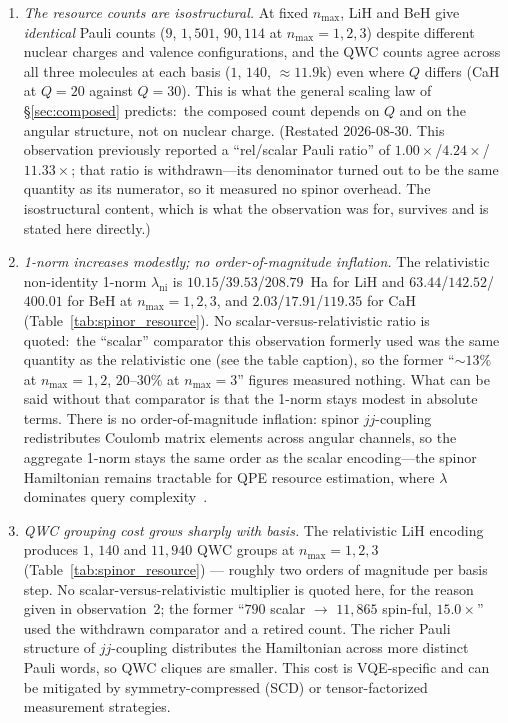 \documentclass[aps,pra,twocolumn,superscriptaddress,longbibliography]{revtex4-2}
\begin{document}
\begin{enumerate}
  \item \emph{The resource counts are isostructural.} At fixed
    $n_{\max}$, LiH and BeH give \emph{identical} Pauli counts
    ($9$, $1{,}501$, $90{,}114$ at $n_{\max}=1,2,3$) despite different
    nuclear charges and valence configurations, and the QWC counts agree
    across all three molecules at each basis ($1$, $140$, $\approx\!11.9$k)
    even where $Q$ differs (CaH at $Q=20$ against $Q=30$).  This is what the
    general scaling law of \S\ref{sec:composed} predicts:\ the composed
    count depends on $Q$ and on the angular structure, not on nuclear
    charge.  (Restated 2026-08-30.  This observation previously reported a
    ``rel/scalar Pauli ratio'' of $1.00\times$/$4.24\times$/$11.33\times$;
    that ratio is withdrawn---its denominator turned out to be the same
    quantity as its numerator, so it measured no spinor overhead.  The
    isostructural content, which is what the observation was for, survives
    and is stated here directly.)

  \item \emph{1-norm increases modestly; no order-of-magnitude inflation.}
The relativistic non-identity 1-norm $\lambda_{\mathrm{ni}}$ is
    $10.15$/$39.53$/$208.79$~Ha for LiH and $63.44$/$142.52$/$400.01$ for
    BeH at $n_{\max}=1,2,3$, and $2.03$/$17.91$/$119.35$ for CaH
    (Table~\ref{tab:spinor_resource}).  No scalar-versus-relativistic
    ratio is quoted:\ the ``scalar'' comparator this observation formerly
    used was the same quantity as the relativistic one (see the table
    caption), so the former ``$\sim 13\%$ at $n_{\max}=1,2$, $20$--$30\%$
    at $n_{\max}=3$'' figures measured nothing.  What can be said without
    that comparator is that the 1-norm stays modest in absolute terms.
    There is no order-of-magnitude inflation: spinor $jj$-coupling
    redistributes
    Coulomb matrix elements across angular channels, so the aggregate
    1-norm stays the same order as the scalar encoding---the spinor
    Hamiltonian remains tractable for QPE resource estimation, where
    $\lambda$ dominates query complexity~\cite{ChildsBerry}.

  \item \emph{QWC grouping cost grows sharply with basis.} The
    relativistic LiH encoding produces $1$, $140$ and $11{,}940$ QWC groups
    at $n_{\max}=1,2,3$ (Table~\ref{tab:spinor_resource}) --- roughly two
    orders of magnitude per basis step.  No scalar-versus-relativistic
    multiplier is quoted here, for the reason given in observation~2; the
    former ``$790$ scalar $\to$ $11{,}865$ spin-ful, $15.0\times$'' used
    the withdrawn comparator and a retired count.
    The richer Pauli structure of $jj$-coupling
    distributes the Hamiltonian across more distinct Pauli words, so
    QWC cliques are smaller. This cost is VQE-specific and can be
    mitigated by symmetry-compressed (SCD) or tensor-factorized
    measurement strategies.
\end{enumerate}
\end{document}
